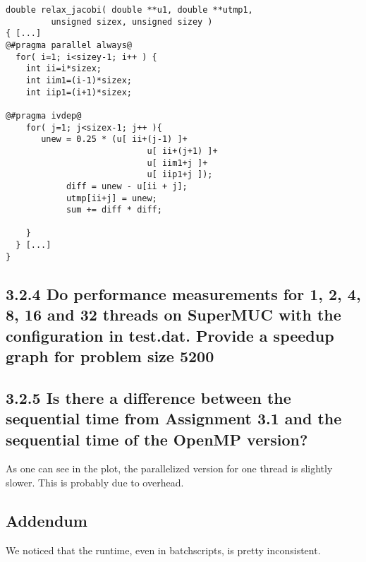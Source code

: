 \begin{lstlisting}
double relax_jacobi( double **u1, double **utmp1,
         unsigned sizex, unsigned sizey )
{ [...]
@#pragma parallel always@
  for( i=1; i<sizey-1; i++ ) {
  	int ii=i*sizex;
  	int iim1=(i-1)*sizex;
  	int iip1=(i+1)*sizex;

@#pragma ivdep@
    for( j=1; j<sizex-1; j++ ){
       unew = 0.25 * (u[ ii+(j-1) ]+
        		            u[ ii+(j+1) ]+
        		            u[ iim1+j ]+
        		            u[ iip1+j ]);
		    diff = unew - u[ii + j];
		    utmp[ii+j] = unew;
		    sum += diff * diff;

    }
  } [...]
}
\end{lstlisting}

\subsection*{3.2.4 Do performance measurements for 1, 2, 4, 8, 16 and 32 threads on SuperMUC with the configuration in test.dat. Provide a speedup graph for problem size 5200}




\subsection*{3.2.5 Is there a difference between the sequential time from Assignment 3.1 and the sequential time of the OpenMP version?}
As one can see in the plot, the parallelized version for one thread is slightly slower. This is probably due to overhead.
\newpage
\subsection*{Addendum}
We noticed that the runtime, even in batchscripts, is pretty inconsistent.

